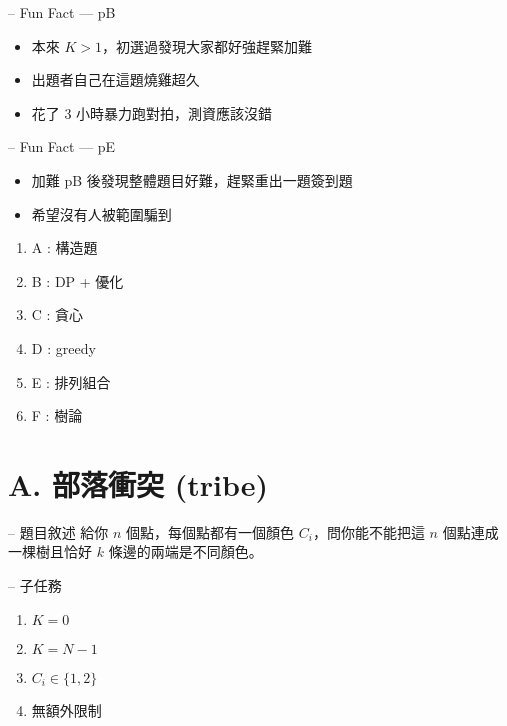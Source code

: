 \documentclass[hyperref,UTF8,notheorems,xcolor={dvipsnames}]{beamer}
\newcommand{\btitle}[1]{{\secname} -- #1}
\theoremstyle{definition}
\begin{document}
\begin{frame}[fragile]{\btitle{Fun Fact --- pB}}
	\begin{itemize}
		\item 本來 $K > 1$，初選過發現大家都好強趕緊加難
		\pause
		\item 出題者自己在這題燒雞超久
		\pause
		\item 花了 3 小時暴力跑對拍，測資應該沒錯
	\end{itemize}
\end{frame}

\begin{frame}[fragile]{\btitle{Fun Fact --- pE}}
	\begin{itemize}
		\item 加難 pB 後發現整體題目好難，趕緊重出一題簽到題
		\pause
		\item 希望沒有人被範圍騙到
	\end{itemize}
\end{frame}


\begin{frame}[fragile]{\secname}
	\begin{enumerate}
		\item A : 構造題
		\item B : DP + 優化
		\item C : 貪心
		\item D : greedy
		\item E : 排列組合
		\item F : 樹論
	\end{enumerate}
\end{frame}

\section{A. 部落衝突 (tribe)}


\begin{frame}[fragile]{\btitle{題目敘述}}
	給你 $n$ 個點，每個點都有一個顏色 $C_i$，問你能不能把這 $n$ 個點連成一棵樹且恰好 $k$ 條邊的兩端是不同顏色。
\end{frame}

\begin{frame}[fragile]{\btitle{子任務}}
	\begin{enumerate}
		\item $K = 0$
		\item $K = N - 1$
		\item $C_i \in \{1, 2\}$
		\item 無額外限制
	\end{enumerate}
\end{frame}
\end{document}
